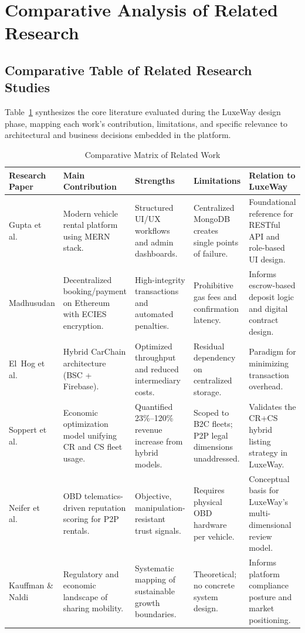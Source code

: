 \section{Comparative Analysis of Related Research}

\subsection{Comparative Table of Related Research Studies}

Table~\ref{tab:lit_matrix} synthesizes the core literature evaluated
during the LuxeWay design phase, mapping each work's contribution,
limitations, and specific relevance to architectural and business
decisions embedded in the platform.

\begin{table}[ht]
\centering
\caption{Comparative Matrix of Related Work}
\label{tab:lit_matrix}
\begin{tabular}{p{2.2cm} p{3.8cm} p{3cm} p{3cm} p{3.5cm}}
\toprule
\textbf{Research Paper} &
\textbf{Main Contribution} &
\textbf{Strengths} &
\textbf{Limitations} &
\textbf{Relation to LuxeWay} \\
\midrule
Gupta et al.\ \cite{gupta2025double} &
Modern vehicle rental platform using MERN stack. &
Structured UI/UX workflows and admin dashboards. &
Centralized MongoDB creates single points of failure. &
Foundational reference for RESTful API and role-based UI design. \\
\midrule
Madhusudan \cite{madhusudan2019applying} &
Decentralized booking/payment on Ethereum with ECIES encryption. &
High-integrity transactions and automated penalties. &
Prohibitive gas fees and confirmation latency. &
Informs escrow-based deposit logic and digital contract design. \\
\midrule
El~Hog et al.\ \cite{elhog2025decentralized} &
Hybrid CarChain architecture (BSC + Firebase). &
Optimized throughput and reduced intermediary costs. &
Residual dependency on centralized storage. &
Paradigm for minimizing transaction overhead. \\
\midrule
Soppert et al.\ \cite{soppert2024benefit} &
Economic optimization model unifying CR and CS fleet usage. &
Quantified 23\%--120\% revenue increase from hybrid models. &
Scoped to B2C fleets; P2P legal dimensions unaddressed. &
Validates the CR+CS hybrid listing strategy in LuxeWay. \\
\midrule
Neifer et al.\ \cite{neifer2024trust} &
OBD telematics-driven reputation scoring for P2P rentals. &
Objective, manipulation-resistant trust signals. &
Requires physical OBD hardware per vehicle. &
Conceptual basis for LuxeWay's multi-dimensional review model. \\
\midrule
Kauffman \& Naldi \cite{kauffman2020research} &
Regulatory and economic landscape of sharing mobility. &
Systematic mapping of sustainable growth boundaries. &
Theoretical; no concrete system design. &
Informs platform compliance posture and market positioning. \\
\bottomrule
\end{tabular}
\end{table}

